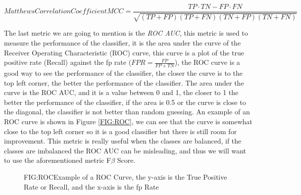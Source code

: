 \begin{equation}[EQ:MCC]{Matthews Correlation Coefficient}
    \boxed{MCC = \frac{TP \cdot TN - FP \cdot FN}{\sqrt{(TP + FP)(TP + FN)(TN + FP)(TN + FN)}}}
\end{equation}

The last metric we are going to mention is the \textit{ROC AUC}, this metric is used to measure the performance of the classifier, it is the area under the curve of the Receiver Operating Characteristic (ROC) curve, this curve is a plot of the true positive rate (Recall) against the \acl{fp} rate ($FPR = \frac{FP}{FP + TN}$), the ROC curve is a good way to see the performance of the classifier, the closer the curve is to the top left corner, the better the performance of the classifier. The area under the curve is the ROC AUC, and it is a value between 0 and 1, the closer to 1 the better the performance of the classifier, if the area is 0.5 or the curve is close to the diagonal, the classifier is not better than random guessing. An example of an ROC curve is shown in Figure \ref{FIG:ROC}, we can see that the curve is somewhat close to the top left corner so it is a good classifier but there is still room for improvement. This metric is really useful when the classes are balanced, if the classes are imbalanced the ROC AUC can be misleading, and thus we will want to use the aforementioned metric F$\beta$ Score.

\begin{figure}[ROC Curve Example]{FIG:ROC}{Example of a ROC Curve, the y-axis is the True Positive Rate or Recall, and the x-axis is the \ac{fp} Rate}
\end{figure}